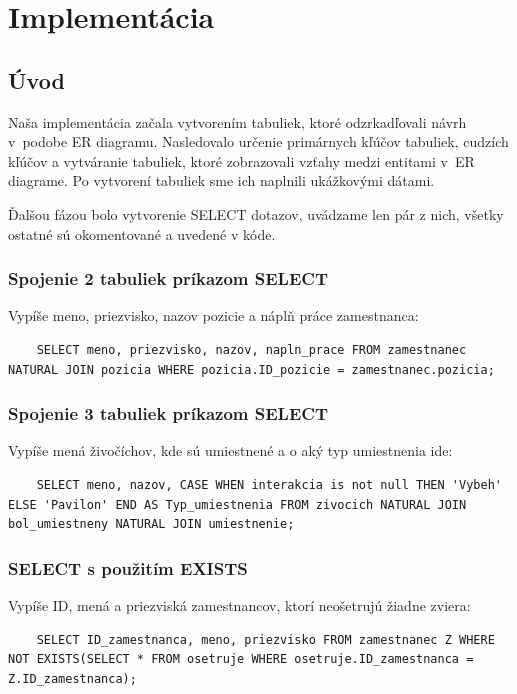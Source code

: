 \documentclass[a4paper, 11pt]{article}
\begin{document}
	\section{Implementácia}
	\subsection{Úvod}
	Naša implementácia začala vytvorením tabuliek, ktoré odzrkadľovali návrh v~podobe ER diagramu. Nasledovalo určenie primárnych kľúčov tabuliek, cudzích kľúčov a vytváranie tabuliek, ktoré zobrazovali vzťahy medzi entitami v~ER diagrame. Po vytvorení tabuliek sme ich naplnili ukážkovými dátami.\\
	\par Ďalšou fázou bolo vytvorenie SELECT dotazov, uvádzame len pár z nich, všetky ostatné sú okomentované a uvedené v kóde.
	\subsubsection{Spojenie 2 tabuliek príkazom SELECT}
	Vypíše meno, priezvisko, nazov pozicie a náplň práce zamestnanca:
	 \begin{lstlisting}
    SELECT meno, priezvisko, nazov, napln_prace FROM zamestnanec NATURAL JOIN pozicia WHERE pozicia.ID_pozicie = zamestnanec.pozicia;
  	 \end{lstlisting}

	\subsubsection{Spojenie 3 tabuliek príkazom SELECT}
	Vypíše mená živočíchov, kde sú umiestnené a o aký typ umiestnenia ide:
	\begin{lstlisting}
    SELECT meno, nazov, CASE WHEN interakcia is not null THEN 'Vybeh' ELSE 'Pavilon' END AS Typ_umiestnenia FROM zivocich NATURAL JOIN bol_umiestneny NATURAL JOIN umiestnenie;
    	\end{lstlisting}
    	
    \subsubsection{SELECT s použitím EXISTS}
    Vypíše ID, mená a priezviská zamestnancov, ktorí neošetrujú žiadne zviera:
    \begin{lstlisting}
    SELECT ID_zamestnanca, meno, priezvisko FROM zamestnanec Z WHERE NOT EXISTS(SELECT * FROM osetruje WHERE osetruje.ID_zamestnanca = Z.ID_zamestnanca);
    \end{lstlisting}
\end{document}
